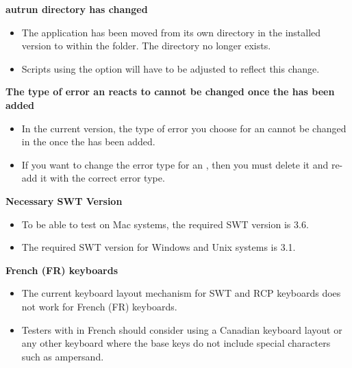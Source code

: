 \textbf{autrun directory has changed}\\
\begin{itemize}
\item The  application has been moved from its own directory in the installed version to within the  folder. The  
directory no longer exists.
\item Scripts using the  option will have to be adjusted to reflect this change.
\end{itemize}

\textbf{The type of error an \gdehandler{} reacts to cannot be changed once the \gdehandler{} has been added}\\
\begin{itemize}
\item  In the current version, the type of error you choose for an \gdehandler{} cannot be changed in the \gdpropview{} once the \gdehandler{} has been added.
\item If you want to change the error type for an \gdehandler{}, then you must delete it and re-add it with the correct error type. 
\end{itemize}

\textbf{Necessary SWT Version}\\
\begin{itemize}
\item To be able to test \gdauts{} on Mac systems, the required SWT version is 3.6. 
\item The required SWT version for Windows and Unix systems is 3.1.
\end{itemize}


\textbf{French (FR) keyboards}\\
\begin{itemize}
\item The current keyboard layout mechanism for SWT and RCP keyboards does not work for French (FR) keyboards.
\item Testers with \gdauts{} in French should consider using a Canadian keyboard layout or any other keyboard where the 
base keys do not include special characters such as ampersand.
\end{itemize}
